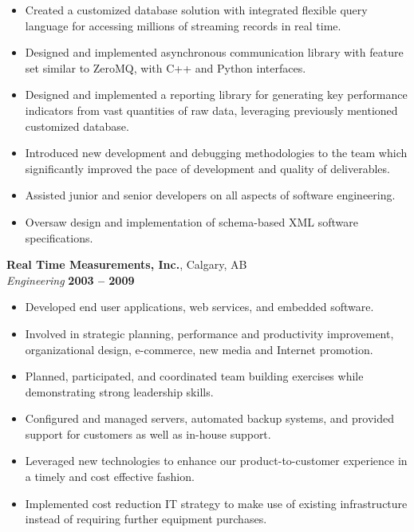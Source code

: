 \documentclass[margin,line]{resume}
\begin{document}
\begin{resume}
    \begin{itemize}
        \item Created a customized database solution with integrated flexible
        query language for accessing millions of streaming records in real time.
        \item Designed and implemented asynchronous communication library with
        feature set similar to ZeroMQ, with C++ and Python interfaces.
        \item Designed and implemented a reporting library for generating key
        performance indicators from vast quantities of raw data, leveraging
        previously mentioned customized database.
        \item Introduced new development and debugging methodologies to the team
        which significantly improved the pace of development and quality of
        deliverables.
        \item Assisted junior and senior developers on all aspects of software
        engineering.
        \item Oversaw design and implementation of schema-based XML software
        specifications.
    \end{itemize}
    
    \textbf{Real Time Measurements, Inc.}, Calgary, AB \vspace{2mm}\\\vspace{1mm}%
    \textsl{Engineering} \hfill \textbf{2003 -- 2009}\\

    \begin{itemize}
        \item Developed end user applications, web services, and embedded
        software.
        \item Involved in strategic planning, performance and productivity
        improvement, organizational design, e-commerce, new media and Internet
        promotion.
        \item Planned, participated, and coordinated team building exercises
        while demonstrating strong leadership skills.
        \item Configured and managed servers, automated backup systems, and
        provided support for customers as well as in-house support.
        \item Leveraged new technologies to enhance our product-to-customer
        experience in a timely and cost effective fashion.
        \item Implemented cost reduction IT strategy to make use of existing
        infrastructure instead of requiring further equipment purchases.
    \end{itemize}


\end{resume}
\end{document}
